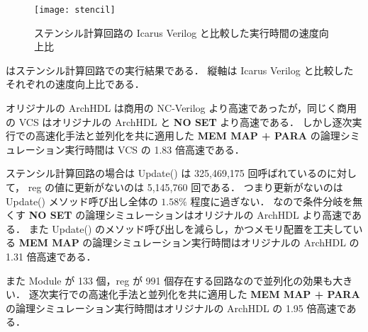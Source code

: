 \fi

\begin{figure}[t]
 \centering
 \texttt{[image: stencil]}
 \caption{ステンシル計算回路の Icarus Verilog と比較した実行時間の速度向上比}
 \label{fig:stencil}
\end{figure}

 はステンシル計算回路での実行結果である．
縦軸は Icarus Verilog と比較したそれぞれの速度向上比である．

オリジナルの ArchHDL は商用の NC-Verilog より高速であったが，同じく商用の VCS はオリジナルの ArchHDL と \textbf{NO SET} より高速である．
しかし逐次実行での高速化手法と並列化を共に適用した \textbf{MEM MAP + PARA} の論理シミュレーション実行時間は VCS の 1.83 倍高速である．

ステンシル計算回路の場合は Update() は 325,469,175 回呼ばれているのに対して，
reg の値に更新がないのは 5,145,760 回である．
つまり更新がないのは Update() メソッド呼び出し全体の $1.58\%$ 程度に過ぎない．
なので条件分岐を無くす \textbf{NO SET} の論理シミュレーションはオリジナルの ArchHDL より高速である．
また Update() のメソッド呼び出しを減らし，かつメモリ配置を工夫している \textbf{MEM MAP} の論理シミュレーション実行時間はオリジナルの ArchHDL の 1.31 倍高速である．

また Module が 133 個，reg が 991 個存在する回路なので並列化の効果も大きい．
逐次実行での高速化手法と並列化を共に適用した \textbf{MEM MAP + PARA} の論理シミュレーション実行時間はオリジナルの ArchHDL の 1.95 倍高速である．


